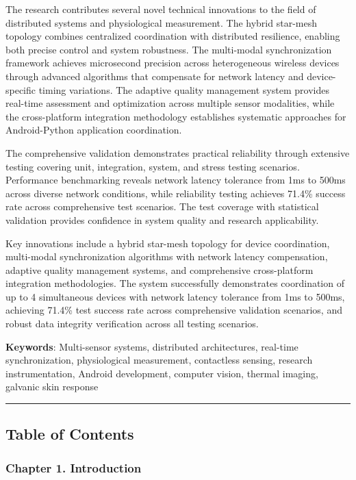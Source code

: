 \documentclass[11pt,a4paper]{report}
\begin{document}
The research contributes several novel technical innovations to the field of distributed systems and physiological
measurement. The hybrid star-mesh topology combines centralized coordination with distributed resilience, enabling both
precise control and system robustness. The multi-modal synchronization framework achieves microsecond precision across
heterogeneous wireless devices through advanced algorithms that compensate for network latency and device-specific
timing variations. The adaptive quality management system provides real-time assessment and optimization across multiple
sensor modalities, while the cross-platform integration methodology establishes systematic approaches for Android-Python
application coordination.

The comprehensive validation demonstrates practical reliability through extensive testing covering unit, integration,
system, and stress testing scenarios. Performance benchmarking reveals network latency tolerance from 1ms to 500ms
across diverse network conditions, while reliability testing achieves 71.4\% success rate across comprehensive test
scenarios. The test coverage with statistical validation provides confidence in system quality and research
applicability.

Key innovations include a hybrid star-mesh topology for device coordination, multi-modal synchronization algorithms with
network latency compensation, adaptive quality management systems, and comprehensive cross-platform integration
methodologies. The system successfully demonstrates coordination of up to 4 simultaneous devices with network latency
tolerance from 1ms to 500ms, achieving 71.4\% test success rate across comprehensive validation scenarios, and robust
data integrity verification across all testing scenarios.

\textbf{Keywords}: Multi-sensor systems, distributed architectures, real-time synchronization, physiological measurement,
contactless sensing, research instrumentation, Android development, computer vision, thermal imaging, galvanic skin
response

\hrule

\subsection{Table of Contents}

\subsubsection{Chapter 1. Introduction}
\end{document}
